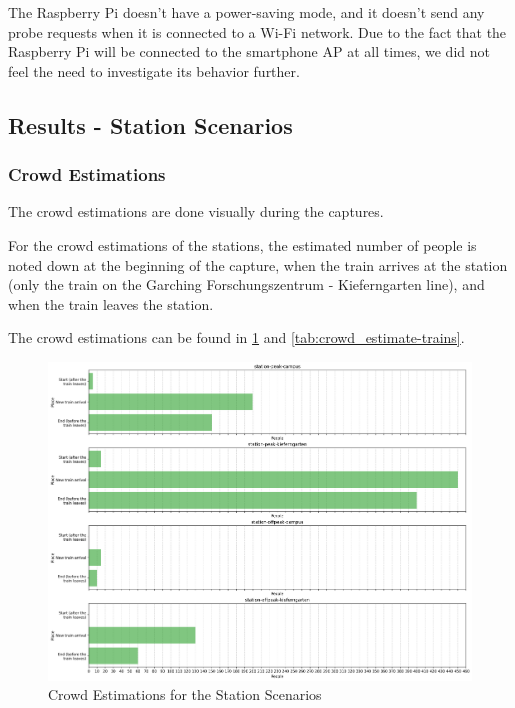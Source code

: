\documentclass[sigconf,nonacm]{acmart}
\begin{document}
The Raspberry Pi doesn't have a power-saving mode, and it doesn't send any probe requests when it is connected to a Wi-Fi network. Due to the fact that the Raspberry Pi will be connected to the smartphone AP at all times, we did not feel the need to investigate its behavior further.

\subsection{Results - Station Scenarios}
\label{sec:part-1/res-station}

\subsubsection{Crowd Estimations}
\label{sec:part-1/station/crowd-estimations}

The crowd estimations are done visually during the captures. 

For the crowd estimations of the stations, the estimated number of people is noted down at the beginning of the capture, when the train arrives at the station (only the train on the Garching Forschungszentrum - Kieferngarten line), and when the train leaves the station.

The crowd estimations can be found in \cref{tab:crowd_estimate-stations} and \cref{tab:crowd_estimate-trains}.

\begin{figure}
    \centering
    \includegraphics[width=\columnwidth]{images/part1/crowd-estimations/crowd-estimate-stations.png}
    \caption{Crowd Estimations for the Station Scenarios}
    \label{tab:crowd_estimate-stations}
\end{figure}
\end{document}
